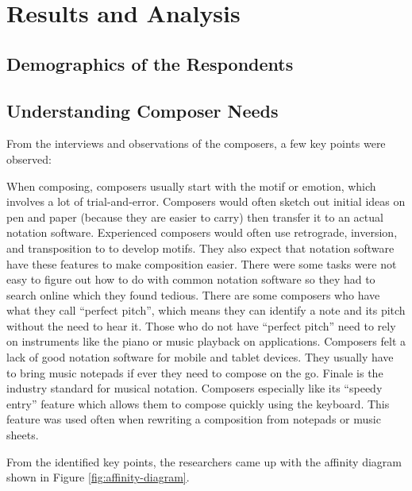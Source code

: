 
\chapter{Results and Analysis}	

	\section{Demographics of the Respondents}
	\label{sec:demographics}

	\section{Understanding Composer Needs}

		From the interviews and observations of the composers, a few key points were observed:
		\begin{outline}
			\1 When composing, composers usually start with the motif or emotion, which involves a lot of trial-and-error.
			\1 Composers would often sketch out initial ideas on pen and paper (because they are easier to carry) then transfer it to an actual notation software. 
			\1 Experienced composers would often use retrograde, inversion, and transposition to to develop motifs. They also expect that notation software have these features to make composition easier. 
			\1 There were some tasks were not easy to figure out how to do with common notation software so they had to search online which they found tedious. 
			\1 There are some composers who have what they call ``perfect pitch'', which means they can identify a note and its pitch without the need to hear it. Those who do not have ``perfect pitch'' need to rely on instruments like the piano or music playback on applications. 
			\1 Composers felt a lack of good notation software for mobile and tablet devices. They usually have to bring music notepads if ever they need to compose on the go. 
			\1 Finale is the industry standard for musical notation. Composers especially like its ``speedy entry'' feature which allows them to compose quickly using the keyboard. This feature was used often when rewriting a composition from notepads or music sheets. 
		\end{outline}

		From the identified key points, the researchers came up with the affinity diagram shown in Figure \ref{fig:affinity-diagram}. 


